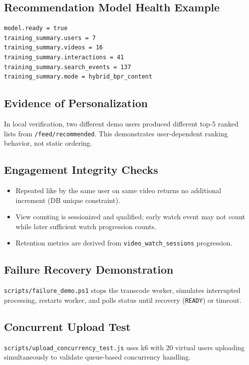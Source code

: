 \documentclass[11pt,a4paper]{article}
\begin{document}
\subsection{Recommendation Model Health Example}
\begin{lstlisting}[style=plain,caption={Recommendation service health summary}]
model.ready = true
training_summary.users = 7
training_summary.videos = 16
training_summary.interactions = 41
training_summary.search_events = 137
training_summary.mode = hybrid_bpr_content
\end{lstlisting}

\subsection{Evidence of Personalization}
In local verification, two different demo users produced different top-5 ranked lists from \texttt{/feed/recommended}. This demonstrates user-dependent ranking behavior, not static ordering.

\subsection{Engagement Integrity Checks}
\begin{itemize}[leftmargin=1.2em]
  \item Repeated like by the same user on same video returns no additional increment (DB unique constraint).
  \item View counting is sessionized and qualified; early watch event may not count while later sufficient watch progression counts.
  \item Retention metrics are derived from \texttt{video\_watch\_sessions} progression.
\end{itemize}

\subsection{Failure Recovery Demonstration}
\texttt{scripts/failure\_demo.ps1} stops the transcode worker, simulates interrupted processing, restarts worker, and polls status until recovery (\texttt{READY}) or timeout.

\subsection{Concurrent Upload Test}
\texttt{scripts/upload\_concurrency\_test.js} uses k6 with 20 virtual users uploading simultaneously to validate queue-based concurrency handling.
\end{document}
